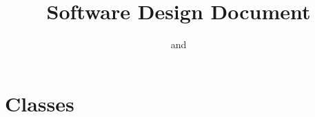 \documentclass[12pt,titlepage]{article}
\title{\app \\
Software Design Document
}
\author{\cha{} and \dav}
\begin{document}
\maketitle
\setcounter{page}{2}
\tableofcontents
\clearpage

\section{Classes}

\end{document}
